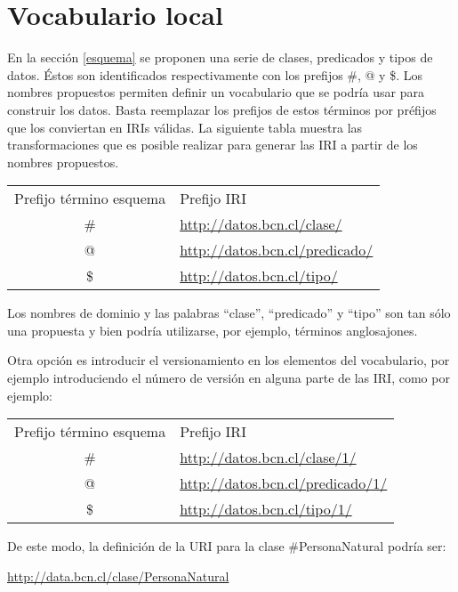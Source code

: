\documentclass[letterpaper,titlepage]{article}
\begin{document}
\section{Vocabulario local}
\label{vocabulario-local}

En la sección \ref{esquema} se proponen una serie de clases,
predicados y tipos de datos. Éstos son identificados respectivamente
con los prefijos \#, @ y \$. Los nombres propuestos permiten definir
un vocabulario que se podría usar para construir los datos. Basta
reemplazar los prefijos de estos términos por préfijos que los
conviertan en IRIs válidas. La siguiente tabla muestra las
transformaciones que es posible realizar para generar las IRI a partir
de los nombres propuestos.

\begin{center}
  \begin{tabular}{cl}
    {\sf Prefijo término esquema} & {\sf Prefijo IRI} \\
    \# & \url{http://datos.bcn.cl/clase/} \\
    @ & \url{http://datos.bcn.cl/predicado/} \\
    \$ & \url{http://datos.bcn.cl/tipo/} \\
  \end{tabular}
\end{center}

Los nombres de dominio y las palabras ``clase'', ``predicado'' y
``tipo'' son tan sólo una propuesta y bien podría utilizarse, por
ejemplo, términos anglosajones.

Otra opción es introducir el versionamiento en los elementos del
vocabulario, por ejemplo introduciendo el número de versión en alguna
parte de las IRI, como por ejemplo:

\begin{center}
  \begin{tabular}{cl}
    {\sf Prefijo término esquema} & {\sf Prefijo IRI} \\
    \# & \url{http://datos.bcn.cl/clase/1/} \\
    @ & \url{http://datos.bcn.cl/predicado/1/} \\
    \$ & \url{http://datos.bcn.cl/tipo/1/} \\
  \end{tabular}
\end{center}

De este modo, la definición de la URI para la clase \#PersonaNatural
podría ser:

\begin{flushleft}
\url{http://data.bcn.cl/clase/PersonaNatural}
\end{flushleft}
\end{document}
